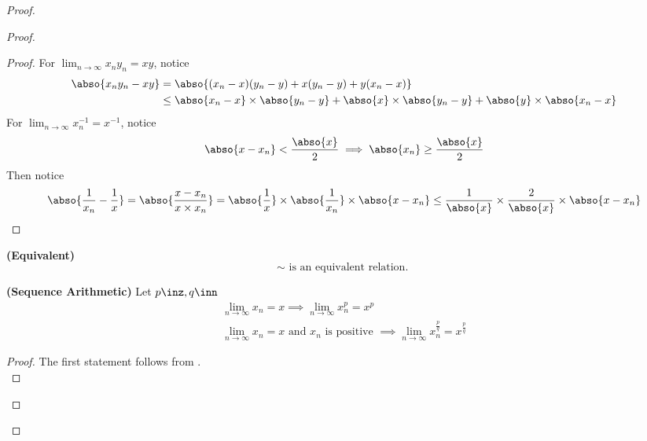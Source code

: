 \documentclass{report}
\begin{document}
\begin{proof}
\begin{proof}
\begin{proof}
For $\lim_{n\to\infty} x_ny_n=xy$, notice
\begin{align*}
  \abso{x_ny_n-xy}&=\abso{(x_n-x)(y_n-y)+x(y_n-y)+y(x_n-x)}\\
  &\leq \abso{x_n-x}\times\abso{y_n-y}+\abso{x}\times\abso{y_n-y}+\abso{y}\times\abso{x_n-x}
\end{align*}
For $\lim_{n\to\infty}x_n^{-1}=x^{-1}$, notice 
\begin{equation*}
  \abso{x-x_n}<\frac{\abso{x}}{2}\implies  \abso{x_n}\geq \frac{\abso{x}}{2}
\end{equation*}
Then notice
\begin{equation*}
\abso{\frac{1}{x_n}-\frac{1}{x}}=\abso{\frac{x-x_n}{x\times x_n}}=\abso{\frac{1}{x}}\times \abso{\frac{1}{x_n}}\times \abso{x-x_n}\leq \frac{1}{\abso{x}}\times \frac{2}{\abso{x}}\times \abso{x-x_n}
\end{equation*}
\end{proof}
\begin{corollary}
\label{4.1.7}
\textbf{(Equivalent)} 
\begin{equation*}
\sim\text{ is an equivalent relation. }
\end{equation*}
\end{corollary}
\begin{corollary}
\label{4.1.8}
\textbf{(Sequence Arithmetic)} Let $p\inz,q\inn$
\begin{gather*}
\lim_{n\to\infty} x_n=x\implies \lim_{n\to\infty} x_n^p=x^p\\
\lim_{n\to\infty} x_n=x\text{ and }x_n\text{ is positive }\implies \lim_{n\to\infty} x_n^{\frac{p}{q}}=x^{\frac{p}{q}}
\end{gather*}
\end{corollary}
\begin{proof}
The first statement follows from .\\


\end{proof}
\end{proof}
\end{proof}
\end{document}
